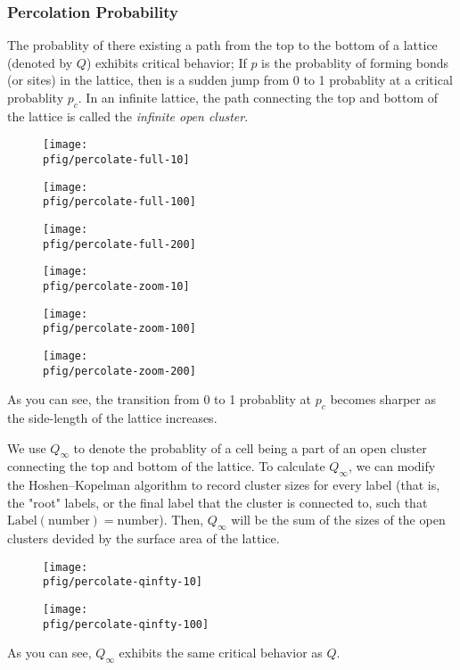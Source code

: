 \documentclass[12pt,a4paper]{article}
\newcommand{\pfig}{../fig/percolation}
\begin{document}
    \subsubsection{Percolation Probability}
    The probablity of there existing a path from the top to the bottom of a lattice (denoted by $Q$) exhibits critical
    behavior; If $p$ is the probablity of forming bonds (or sites) in the lattice, then is a sudden jump from 0 to 1
    probablity at a critical probablity $p_c$. In an infinite lattice, the path connecting the top and bottom of
    the lattice is called the \emph{infinite open cluster}.

    \begin{figure}
        \centering
        \texttt{[image: \\pfig/percolate-full-10]}
    \end{figure}
    \begin{figure}
        \centering
        \texttt{[image: \\pfig/percolate-full-100]}
    \end{figure}
    \begin{figure}
        \centering
        \texttt{[image: \\pfig/percolate-full-200]}
    \end{figure}
    \begin{figure}
        \centering
        \texttt{[image: \\pfig/percolate-zoom-10]}
    \end{figure}
    \begin{figure}
        \centering
        \texttt{[image: \\pfig/percolate-zoom-100]}
    \end{figure}
    \begin{figure}
        \centering
        \texttt{[image: \\pfig/percolate-zoom-200]}
    \end{figure}

    As you can see, the transition from 0 to 1 probablity at $p_c$ becomes sharper as the side-length of the lattice
    increases.

    We use $Q_\infty$ to denote the probablity of a cell being a part of an open cluster connecting the top and bottom
    of the lattice. To calculate $Q_\infty$, we can modify the Hoshen--Kopelman algorithm to record cluster sizes for
    every label (that is, the "root" labels, or the final label that the cluster is connected to, such that
    $\mathrm{Label(number) = number}$). Then, $Q_\infty$ will be the sum of the sizes of the open clusters devided by
    the surface area of the lattice.

    \begin{figure}
        \centering
        \texttt{[image: \\pfig/percolate-qinfty-10]}
    \end{figure}
    \begin{figure}
        \centering
        \texttt{[image: \\pfig/percolate-qinfty-100]}
    \end{figure}

    As you can see, $Q_\infty$ exhibits the same critical behavior as $Q$.
\end{document}
